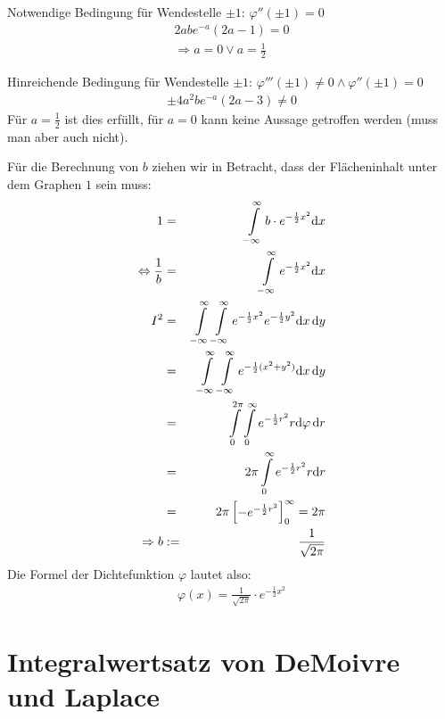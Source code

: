 \documentclass[12pt,a4paper,twocolumn]{article}
\begin{document}
Notwendige Bedingung für Wendestelle $\pm 1$: $\varphi''(\pm 1)=0$\\
\begin{eqnarray}
2abe^{-a} (2a-1) = 0 \\
\Rightarrow a = 0 \lor a = \frac{1}{2}
\end{eqnarray}

Hinreichende Bedingung für Wendestelle $\pm 1$: $\varphi'''(\pm 1)\neq 0 \wedge \varphi''(\pm 1)=0$
\begin{eqnarray}
\pm 4 a^{2} b e^{-a}(2 a -3) \neq 0
\end{eqnarray}
Für $a=\frac{1}{2}$ ist dies erfüllt, für $a=0$ kann keine Aussage getroffen werden (muss man aber auch nicht).

Für die Berechnung von $b$ ziehen wir in Betracht, dass der Flächeninhalt unter dem Graphen $1$ sein muss:
\begin{eqnarray}
1&=&\int\displaylimits^{\infty}_{-\infty} b \cdot e^{-\frac{1}{2}x^2} {\mathrm d}x \\
\Leftrightarrow \frac{1}{b}&=&\int\displaylimits^{\infty}_{-\infty} e^{-\frac{1}{2}x^2} {\mathrm d}x \\
I^2 &=& \int\displaylimits^{\infty}_{-\infty} \int\displaylimits^{\infty}_{-\infty} e^{-\frac{1}{2}x^2} e^{-\frac{1}{2}y^2} {\mathrm d}x \, {\mathrm d}y \\
&=& \int\displaylimits^{\infty}_{-\infty} \int\displaylimits^{\infty}_{-\infty} e^{-\frac{1}{2}(x^2 + y^2)} {\mathrm d}x \, {\mathrm d}y \\ 
&=& \int\displaylimits^{2 \pi}_{0} \int\displaylimits^{\infty}_{0} e^{-\frac{1}{2}r^2} r{\mathrm d}\varphi \, {\mathrm d}r \\
&=& 2 \pi \int\displaylimits^{\infty}_{0} e^{-\frac{1}{2}r^2} r{\mathrm d}r \\
&=& 2 \pi \begin{bmatrix}-e^{-\frac{1}{2} r^2} \end{bmatrix}^\infty_0 = 2 \pi\\
\Rightarrow b&:=&\frac{1}{\sqrt{2\pi}}
\end{eqnarray}
Die Formel der Dichtefunktion $\varphi$ lautet also:
\begin{eqnarray}
 \varphi(x) = \frac{1}{\sqrt{2\pi}} \cdot e^{-\frac{1}{2}x^2}
\end{eqnarray}




 \section{Integralwertsatz von DeMoivre und Laplace}
\end{document}
